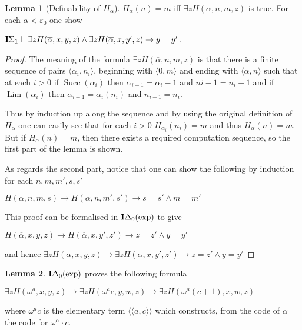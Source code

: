 \documentclass[8pt]{article}
\theoremstyle{definition}
\theoremstyle{definition}
\theoremstyle{definition}
\theoremstyle{definition}
\theoremstyle{definition}
\theoremstyle{definition}
\theoremstyle{definition}
\theoremstyle{definition}
\newtheorem{lemma}{Lemma}[section]
\theoremstyle{definition}
\theoremstyle{definition}
\theoremstyle{definition}
\theoremstyle{definition}
\theoremstyle{definition}
\theoremstyle{question}
\begin{document}
\begin{lemma}[Definability of $H_{\alpha}$]
$H_{\alpha}(n) = m$ iff $\exists z H(\overline{\alpha}, n, m, z)$ is true. For each $\alpha < \varepsilon_0$ one show
\begin{center}
  ${\bf I}\Sigma_1 \vdash \exists z H(\overline{\alpha}, x, y, z) \land \exists z H(\overline{\alpha}, x, y', z) \to y = y'$.
\end{center}
\end{lemma}
 
\begin{proof}
  The meaning of the formula $\exists z H(\overline{\alpha}, n, m, z)$ is that there is a finite
  sequence of pairs $\langle \alpha_i, n_i \rangle$, beginning with $\langle 0, m \rangle$ and ending with 
  $\langle \alpha, n \rangle$ such that at each $i > 0$ if $\operatorname{Succ}(\alpha_i)$ then 
  $\alpha_{i - 1} = \alpha_i - 1$ and $n{i - 1} = n_i + 1$ and if $\operatorname{Lim}(\alpha_i)$ then
  $\alpha_{i - 1} = \alpha_i(n_i)$ and $n_{i - 1} = n_i$.

  Thus by induction up along the sequence and by using the original definition of $H_{\alpha}$
  one can easily see that for each $i > 0$ $H_{\alpha_i}(n_i) = m$ and thus $H_{\alpha}(n) = m$.
  But if $H_{\alpha}(n) = m$, then there exists a required computation sequence, so the first part of the lemma is shown.

  As regards the second part, notice that one can show the following by induction for each $n,m,m',s,s'$
  \begin{center}
    $H(\overline{\alpha}, n, m, s) \to H(\overline{\alpha}, n, m', s') \to s = s' \land m = m'$
  \end{center}
  This proof can be formalised in ${\bf I}\Delta_0(\operatorname{exp})$ to give
  \begin{center}
    $H(\overline{\alpha}, x, y, z) \to H(\overline{\alpha}, x, y', z') \to z = z' \land y = y'$
  \end{center}
  and hence
  $\exists z H(\overline{\alpha}, x, y, z) \to \exists z H(\overline{\alpha}, x, y', z') \to z = z' \land y = y'$
\end{proof}

\begin{lemma}
  ${\bf I}\Delta_0(\operatorname{exp})$ proves the following formula
  \begin{center}
    $\exists z H(\omega^a, x,y,z) \to \exists z H(\omega^a c, y, w, z) \to \exists z H(\omega^a(c + 1), x, w, z)$
  \end{center}
  where $\omega^a c$ is the elementary term $\langle \langle a, c \rangle \rangle$ which constructs, from the code of
  $\alpha$ the code for $\omega^{\alpha} \cdot c$.
\end{lemma}
\end{document}
